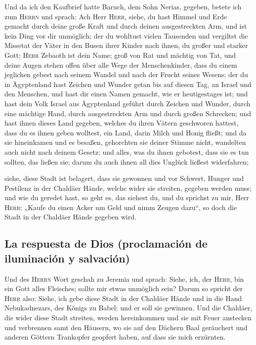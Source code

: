  Und da ich den Kaufbrief hatte Baruch, dem Sohn Nerias,
gegeben, betete ich zum \textsc{Herrn} und sprach:  Ach
Herr \textsc{Herr}, siehe, du hast Himmel und Erde gemacht durch deine
große Kraft und durch deinen ausgestreckten Arm, und ist kein Ding vor
dir unmöglich;  der du wohltust vielen Tausenden und
vergiltst die Missetat der Väter in den Busen ihrer Kinder nach ihnen,
du großer und starker Gott; \textsc{Herr} Zebaoth ist dein Name;
 groß von Rat und mächtig von Tat, und deine Augen stehen
offen über alle Wege der Menschenkinder, dass du einem jeglichen gebest
nach seinem Wandel und nach der Frucht seines Wesens; 
der du in Ägyptenland hast Zeichen und Wunder getan bis auf diesen Tag,
an Israel und den Menschen, und hast dir einen Namen gemacht, wie er
heutigestages ist;  und hast dein Volk Israel aus
Ägyptenland geführt durch Zeichen und Wunder, durch eine mächtige Hand,
durch ausgestreckten Arm und durch großen Schrecken;  und
hast ihnen dieses Land gegeben, welches du ihren Vätern geschworen
hattest, dass du es ihnen geben wolltest, ein Land, darin Milch und
Honig fließt;  und da sie hineinkamen und es besaßen,
gehorchten sie deiner Stimme nicht, wandelten auch nicht nach deinem
Gesetz; und alles, was du ihnen gebotest, dass sie es tun sollten, das
ließen sie; darum du auch ihnen all dies Unglück ließest widerfahren;

 siehe, diese Stadt ist belagert, dass sie gewonnen und
vor Schwert, Hunger und Pestilenz in der Chaldäer Hände, welche wider
sie streiten, gegeben werden muss; und wie du geredet hast, so geht es,
das siehest du,  und du sprichst zu mir, Herr
\textsc{Herr}: „Kaufe du einen Acker um Geld und nimm Zeugen dazu``, so
doch die Stadt in der Chaldäer Hände gegeben wird.

\hypertarget{la-respuesta-de-dios-proclamaciuxf3n-de-iluminaciuxf3n-y-salvaciuxf3n}{%
\subsection{La respuesta de Dios (proclamación de iluminación y
salvación)}\label{la-respuesta-de-dios-proclamaciuxf3n-de-iluminaciuxf3n-y-salvaciuxf3n}}

 Und des \textsc{Herrn} Wort geschah zu Jeremia und
sprach:  Siehe, ich, der \textsc{Herr}, bin ein Gott
alles Fleisches; sollte mir etwas unmöglich sein?  Darum
so spricht der \textsc{Herr} also: Siehe, ich gebe diese Stadt in der
Chaldäer Hände und in die Hand Nebukadnezars, des Königs zu Babel; und
er soll sie gewinnen.  Und die Chaldäer, die wider diese
Stadt streiten, werden hereinkommen und sie mit Feuer anstecken und
verbrennen samt den Häusern, wo sie auf den Dächern Baal geräuchert und
anderen Göttern Trankopfer geopfert haben, auf dass sie mich erzürnten.

